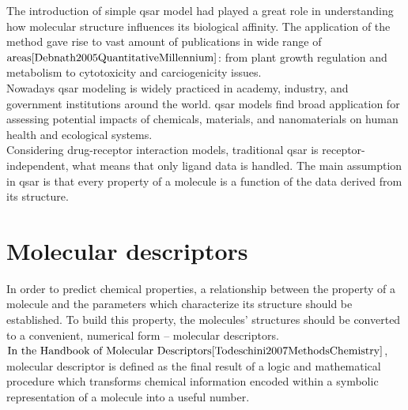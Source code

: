 The introduction of simple \acrshort{qsar} model had played a great role in understanding 
how molecular structure influences its biological affinity.
The application of the method gave rise to vast amount of publications in wide range 
of $\text{areas}{\cite{Debnath2005QuantitativeMillennium}}$: from plant growth 
regulation and metabolism to cytotoxicity and carciogenicity issues.
\hfill\break\\

Nowadays \acrshort{qsar} modeling is widely practiced in academy, industry, and 
government institutions around the world. %
\acrshort{qsar} models find broad application for assessing potential impacts of chemicals, materials, and nanomaterials on human health and ecological systems.
\hfill\break\\
Considering drug-receptor interaction models, traditional \acrshort{qsar} is receptor-independent, 
what means that only ligand data is handled.
The main assumption in \acrshort{qsar} is that every property of a molecule is a 
function of the data derived from its structure.
\hfill\break\\
\section{Molecular descriptors}
  In order to predict chemical properties, a relationship between the property of 
a molecule and the parameters which characterize its structure should be established.
  To build this property, the molecules' structures should be converted to a convenient, 
numerical form -- molecular descriptors.
  $\text{In the Handbook of Molecular Descriptors}{\cite{Todeschini2007MethodsChemistry}}$, %
  molecular descriptor is defined as the final result of a logic and mathematical 
procedure which transforms chemical information encoded within a symbolic representation 
of a molecule into a useful number. \\

